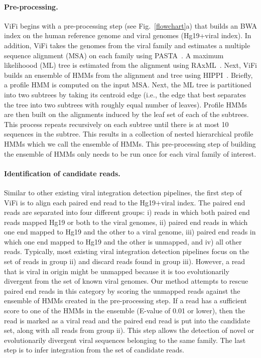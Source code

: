 \documentclass{bioinfo}
\begin{document}
\paragraph{\textbf{Pre-processing.}} ViFi begins with a pre-processing step (see Fig.~\ref{flowchart}a) that builds an BWA index on the human reference genome and viral genomes (Hg19+viral index).  In addition, ViFi takes the genomes from the viral family and estimates a multiple sequence alignment (MSA) on each family using PASTA~\cite{Mirarab2014}.  A maximum likelihoood (ML) tree is estimated from the alignment using RAxML~\cite{Stamatakis2014}.  Next, ViFi builds an ensemble of HMMs from the alignment and tree using HIPPI~\cite{Nguyen2016_hippi}.  Briefly, a profile HMM is computed on the input MSA.  Next, the ML tree is partitioned into two subtrees by taking its centroid edge (i.e., the edge that best separates the tree into two subtrees with roughly equal number of leaves).  Profile HMMs are then built on the alignments induced by the leaf set of each of the subtrees.  This process repeats recursively on each subtree until there is at most 10 sequences in the subtree.  This results in a collection of nested hierarchical profile HMMs which we call the ensemble of HMMs.  This pre-processing step of building the ensemble of HMMs only needs to be run once for each viral family of interest.

\paragraph{\textbf{Identification of candidate reads.}} Similar to other existing viral integration detection pipelines, the first step of ViFi is to align each paired end read to the Hg19+viral index.  The paired end reads are separated into four different groups: i) reads in which both paired end reads mapped Hg19 or both to the viral genomes, ii) paired end reads in which one end mapped to Hg19 and the other to a viral genome, iii) paired end reads in which one end mapped to Hg19 and the other is unmapped, and iv) all other reads.  Typically, most existing viral integration detection pipelines focus on the set of reads in group ii) and discard reads found in group iii).  However, a read that is viral in origin might be unmapped because it is too evolutionarily divergent from the set of known viral genomes.  Our method attempts to rescue paired end reads in this category by scoring the unmapped reads against the ensemble of HMMs created in the pre-processing step.  If a read has a sufficient score to one of the HMMs in the ensemble (E-value of 0.01 or lower), then the read is marked as a viral read and the paired end read is put into the candidate set, along with all reads from group ii).  This step allows the detection of novel or evolutionarily divergent viral sequences belonging to the same family.  The last step is to infer integration from the set of candidate reads.  
\end{document}
